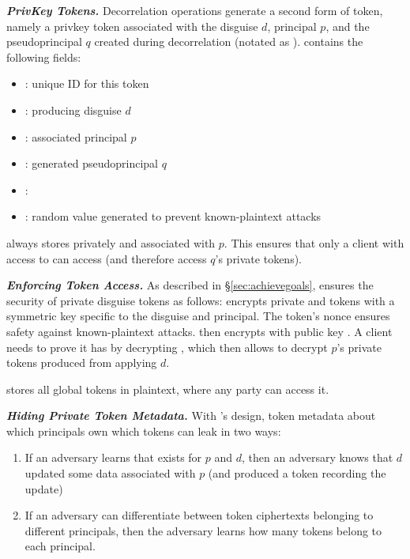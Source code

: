 \noindent\textbf{\emph{PrivKey Tokens.}}
Decorrelation operations generate a second form of token, namely a privkey token associated with the disguise $d$, principal $p$, and the pseudoprincipal $q$ created
during decorrelation (notated as ).
 contains the following fields:
\begin{itemize}
\item {}: unique ID for this token
\item {}: producing disguise $d$ 
\item {}: associated principal $p$
\item {}: generated pseudoprincipal $q$
\item {}: 
\item {}: random value generated to prevent known-plaintext attacks
\end{itemize}
\sys always stores  privately and associated with $p$. This ensures that only a client
with access to  can access  (and therefore access $q$'s private tokens).

\vspace{12pt}
\noindent\textbf{\emph{Enforcing Token Access.}}
As described in \S\ref{sec:achievegoals}, \sys ensures the security of private disguise tokens as
follows: \sys encrypts private  and  tokens with a symmetric key  specific to
the disguise and principal. The token's nonce ensures safety against
known-plaintext attacks. \sys then encrypts  with public key .
A client needs to prove it has  by decrypting , %
which then allows \sys to decrypt $p$'s private tokens produced from applying $d$.

\sys stores all global  tokens in plaintext, where any party can access it.


\vspace{12pt}
\noindent\textbf{\emph{Hiding Private Token Metadata.}}
With \sys's design, token metadata about which principals own which tokens can leak in two ways:
\begin{enumerate}
    \item If an adversary learns that  exists for $p$ and $d$, 
        then an adversary knows that $d$ updated some data associated with $p$ (and produced a token
        recording the update)
    \item If an adversary can differentiate between token ciphertexts belonging to different
        principals, then the adversary learns how many tokens belong to each principal.
\end{enumerate}

